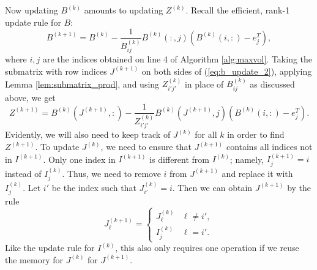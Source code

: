 \documentclass{article}
\begin{document}
	
	Now updating $B^{(k)}$ amounts to updating $Z^{(k)}$. Recall the efficient, rank-1 update rule for $B$:
	\begin{equation}
		\label{eq:b_update_2}
		B^{(k+1)} = B^{(k)} - \frac{1}{B^{(k)}_{ij}}B^{(k)}(:,j)\left(B^{(k)}(i,:) - e_j^T\right),
	\end{equation}
	where $i,j$ are the indices obtained on line 4 of Algorithm \ref{alg:maxvol}. Taking the submatrix with row indices $J^{(k+1)}$ on both sides of (\ref{eq:b_update_2}), applying Lemma \ref{lem:submatrix_prod}, and using $Z^{(k)}_{i'j'}$ in place of $B^{(k)}_{ij}$ as discussed above, we get
	\begin{equation}
		\label{eq:z_update_partial}
		Z^{(k+1)} = B^{(k)}\left(J^{(k+1)}, :\right) - \frac{1}{Z^{(k)}_{i'j'}}B^{(k)}\left(J^{(k+1)}, j\right)\left(B^{(k)}(i,:) - e_j^T\right).
	\end{equation}
	Evidently, we will also need to keep track of $J^{(k)}$ for all $k$ in order to find $Z^{(k+1)}$. To update $J^{(k)}$, we need to ensure that $J^{(k+1)}$ contains all indices not in $I^{(k+1)}$. Only one index in $I^{(k+1)}$ is different from $I^{(k)}$; namely, $I^{(k+1)}_j = i$ instead of $I^{(k)}_j$. Thus, we need to remove $i$ from $J^{(k+1)}$ and replace it with $I^{(k)}_j$. Let $i'$ be the index such that $J^{(k)}_{i'} = i$. Then we can obtain $J^{(k+1)}$ by the rule
	\begin{equation}
		J^{(k+1)}_\ell = \begin{cases}
			J^{(k)}_\ell & \ell \ne i', \\
			I^{(k)}_j & \ell = i'.
		\end{cases}
	\end{equation}
	Like the update rule for $I^{(k)}$, this also only requires one operation if we reuse the memory for $J^{(k)}$ for $J^{(k+1)}$. 
	
\end{document}

